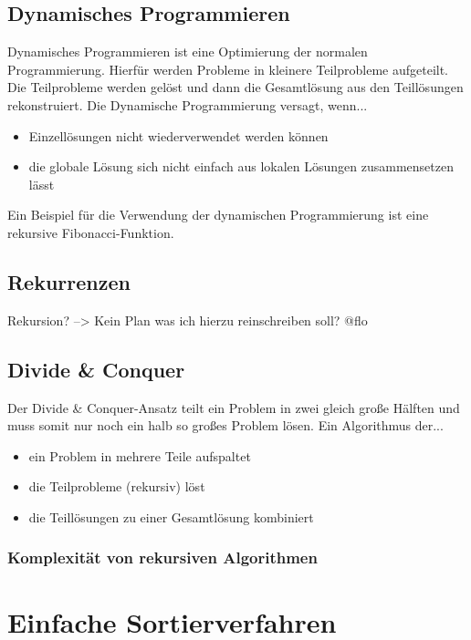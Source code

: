 \documentclass[12pt,a4paper]{article}
\begin{document}
\subsection{Dynamisches Programmieren}
Dynamisches Programmieren ist eine Optimierung der normalen Programmierung. Hierfür werden Probleme in kleinere Teilprobleme aufgeteilt. Die Teilprobleme werden gelöst und dann die Gesamtlösung aus den Teillösungen rekonstruiert.\newline
Die Dynamische Programmierung versagt, wenn...
\vspace{.35cm}
\begin{itemize}
	\item Einzellösungen nicht wiederverwendet werden können
	\item die globale Lösung sich nicht einfach aus lokalen Lösungen zusammensetzen lässt
\end{itemize}
\vspace{.35cm}
Ein Beispiel für die Verwendung der dynamischen Programmierung ist eine rekursive Fibonacci-Funktion.

\subsection{Rekurrenzen}
Rekursion? --> Kein Plan was ich hierzu reinschreiben soll? @flo

\subsection{Divide \& Conquer}
Der Divide \& Conquer-Ansatz teilt ein Problem in zwei gleich große Hälften und muss somit nur noch ein halb so großes Problem lösen.\newline
Ein Algorithmus der...
\begin{itemize}
	\item ein Problem in mehrere Teile aufspaltet
	\item die Teilprobleme (rekursiv) löst
	\item die Teillösungen zu einer Gesamtlösung kombiniert
\end{itemize}

\subsubsection{Komplexität von rekursiven Algorithmen}


\section{Einfache Sortierverfahren}
\end{document}
